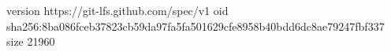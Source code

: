 version https://git-lfs.github.com/spec/v1
oid sha256:8ba086fceb37823cb59da97fa5fa501629cfe8958b40bdd6dc8ae79247fbf337
size 21960
